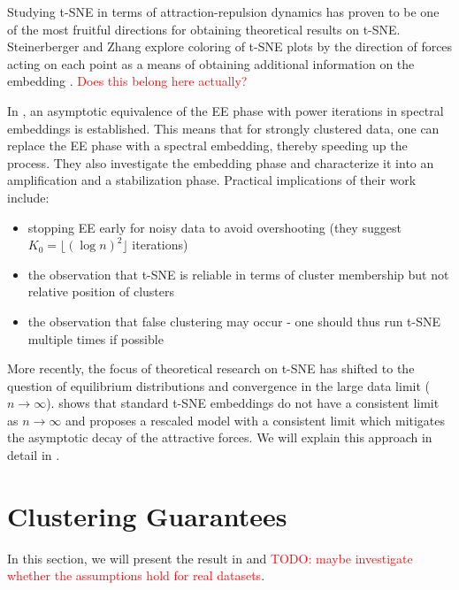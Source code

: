 Studying t-SNE in terms of attraction-repulsion dynamics has proven to be one of the most fruitful directions for obtaining theoretical results on t-SNE. 
Steinerberger and Zhang explore coloring of t-SNE plots by the direction of forces acting on each point as a means of obtaining additional information on the embedding \cite{SteiZhang22}. \textcolor{red}{Does this belong here actually?}

In \cite{Cai22}, an asymptotic equivalence of the EE phase with power iterations in spectral embeddings is established. 
This means that for strongly clustered data, one can replace the EE phase with a spectral embedding, thereby speeding up the process. 
They also investigate the embedding phase and characterize it into an amplification and a stabilization phase. 
Practical implications of their work include: 
\begin{itemize}
    \item stopping EE early for noisy data to avoid overshooting (they suggest $K_0 = \lfloor (\log n)^2 \rfloor$ iterations)
    \item the observation that t-SNE is reliable in terms of cluster membership but not relative position of clusters 
    \item the observation that false clustering may occur - one should thus run t-SNE multiple times if possible
\end{itemize}
More recently, the focus of theoretical research on t-SNE has shifted to the question of equilibrium distributions and convergence in the large data limit ($n \to \infty$). 
\cite{murray2024largedatalimitsscaling} shows that standard t-SNE embeddings do not have a consistent limit as $n \to \infty$ and proposes a rescaled model with a consistent limit which mitigates the asymptotic decay of the attractive forces. 
We will explain this approach in detail in . 

\section{Clustering Guarantees}\label{sec:clustering}
In this section, we will present the result in \cite{LinStei22} and \textcolor{red}{TODO: maybe investigate whether the assumptions hold for real datasets}. 

